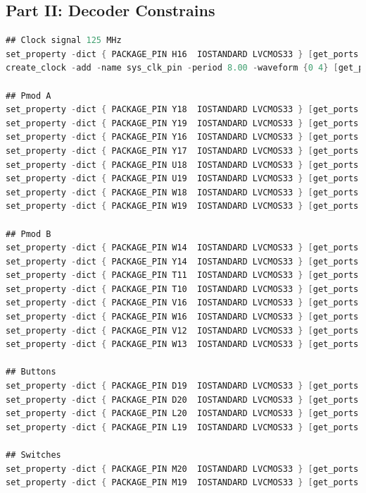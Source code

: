\subsection{Part II: Decoder Constrains} \label{subsec: Part II: Decoder Constrains}
\begin{lstlisting}[language=verilog,caption={Decoder Constrains part II.},label=lst: decoder Constrains part II]
## Clock signal 125 MHz
set_property -dict { PACKAGE_PIN H16  IOSTANDARD LVCMOS33 } [get_ports { clk }];
create_clock -add -name sys_clk_pin -period 8.00 -waveform {0 4} [get_ports { clk }];

## Pmod A
set_property -dict { PACKAGE_PIN Y18  IOSTANDARD LVCMOS33 } [get_ports { seg0[0] }];
set_property -dict { PACKAGE_PIN Y19  IOSTANDARD LVCMOS33 } [get_ports { seg0[1] }];
set_property -dict { PACKAGE_PIN Y16  IOSTANDARD LVCMOS33 } [get_ports { seg0[2] }];
set_property -dict { PACKAGE_PIN Y17  IOSTANDARD LVCMOS33 } [get_ports { seg0[3] }];
set_property -dict { PACKAGE_PIN U18  IOSTANDARD LVCMOS33 } [get_ports { seg0[4] }];
set_property -dict { PACKAGE_PIN U19  IOSTANDARD LVCMOS33 } [get_ports { seg0[5] }];
set_property -dict { PACKAGE_PIN W18  IOSTANDARD LVCMOS33 } [get_ports { seg0[6] }];
set_property -dict { PACKAGE_PIN W19  IOSTANDARD LVCMOS33 } [get_ports { cat0 }];

## Pmod B
set_property -dict { PACKAGE_PIN W14  IOSTANDARD LVCMOS33 } [get_ports { seg1[0] }];
set_property -dict { PACKAGE_PIN Y14  IOSTANDARD LVCMOS33 } [get_ports { seg1[1] }];
set_property -dict { PACKAGE_PIN T11  IOSTANDARD LVCMOS33 } [get_ports { seg1[2] }];
set_property -dict { PACKAGE_PIN T10  IOSTANDARD LVCMOS33 } [get_ports { seg1[3] }];
set_property -dict { PACKAGE_PIN V16  IOSTANDARD LVCMOS33 } [get_ports { seg1[4] }];
set_property -dict { PACKAGE_PIN W16  IOSTANDARD LVCMOS33 } [get_ports { seg1[5] }];
set_property -dict { PACKAGE_PIN V12  IOSTANDARD LVCMOS33 } [get_ports { seg1[6] }];
set_property -dict { PACKAGE_PIN W13  IOSTANDARD LVCMOS33 } [get_ports { cat1 }];

## Buttons
set_property -dict { PACKAGE_PIN D19  IOSTANDARD LVCMOS33 } [get_ports { BTN0 }];
set_property -dict { PACKAGE_PIN D20  IOSTANDARD LVCMOS33 } [get_ports { BTN1 }];
set_property -dict { PACKAGE_PIN L20  IOSTANDARD LVCMOS33 } [get_ports { BTN2 }];
set_property -dict { PACKAGE_PIN L19  IOSTANDARD LVCMOS33 } [get_ports { BTN3 }];

## Switches
set_property -dict { PACKAGE_PIN M20  IOSTANDARD LVCMOS33 } [get_ports { SW0 }];
set_property -dict { PACKAGE_PIN M19  IOSTANDARD LVCMOS33 } [get_ports { SW1 }];
\end{lstlisting}